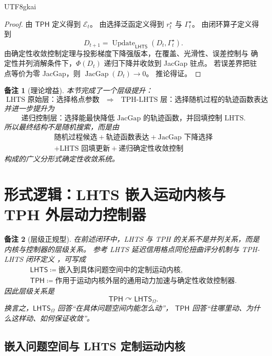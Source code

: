\documentclass[12pt]{article}
\newtheorem{remark}{备注}[section]
\newcommand{\LHTS}{\ensuremath{\mathsf{LHTS}}}
\newcommand{\TPH}{\ensuremath{\mathsf{TPH}}}
\newcommand{\DefEq}{\coloneqq}
\DeclareMathOperator{\JacGap}{JacGap}
\DeclareMathOperator{\Update}{Update}
\begin{document}
\begin{CJK*}{UTF8}{gkai}
\begin{proof}
由 \(\TPH\) 定义得到 \(\mathcal E_t\)。
由选择泛函定义得到 \(r_t^\star\) 与 \(\Gamma_t^\star\)。
由闭环算子定义得到
\[
D_{t+1}
=
\Update_{\LHTS}(D_t,\Gamma_t^\star).
\]
由确定性收敛控制定理与投影梯度下降强版本，在覆盖、光滑性、误差控制与
确定性并列消解条件下，\(\Phi(D_t)\) 递归下降并收敛到 JacGap 驻点。
若误差界把驻点等价为零 JacGap，则 \(\JacGap(D_t)\to0\)。
推论得证。
\end{proof}

\begin{remark}[理论增益]
本节完成了一个层级提升：
\[
\boxed{
\text{LHTS 原始层：选择格点参数}
\quad\Longrightarrow\quad
\text{TPH-LHTS 层：选择随机过程的轨迹函数表达}
}
\]
并进一步提升为
\[
\boxed{
\text{递归控制层：选择能最快降低 JacGap 的轨迹函数，并回填控制 LHTS}.
}
\]
所以最终结构不是随机搜索，而是由
\[
\boxed{
\begin{gathered}
\text{随机过程候选}
+\text{轨迹函数表达}
+\text{JacGap 下降选择}
\\
+\text{LHTS 回填更新}
+\text{递归确定性收敛控制}
\end{gathered}
}
\]
构成的广义分形式确定性收敛系统。
\end{remark}

\section{形式逻辑：LHTS 嵌入运动内核与 TPH 外层动力控制器}
\label{sec:lhts-kernel-tph-controller}

\begin{remark}[层级正规型]
在前述闭环中，LHTS 与 TPH 的关系不是并列关系，而是内核与控制器的层级关系。
参考 LHTS 延迟信用格点同伦扭曲评分机制与 TPH-LHTS 闭环定义
\cite{RepoTex56LHTS,RepoTex55PDEParadigm}，可写成
\[
\boxed{
\begin{gathered}
\LHTS
\DefEq
\text{嵌入到具体问题空间中的定制运动内核},
\\
\TPH
\DefEq
\text{作用于运动内核外层的通用动力加速与确定性收敛控制器}.
\end{gathered}
}
\]
因此层级关系是
\[
\boxed{
\TPH\curvearrowright\LHTS_{\Omega}.
}
\]
换言之，\(\LHTS_\Omega\) 回答“在具体问题空间内能怎么动”，
\(\TPH\) 回答“往哪里动、为什么这样动、如何保证收敛”。
\end{remark}

\subsection{嵌入问题空间与 LHTS 定制运动内核}
\label{subsec:embedded-problem-lhts-kernel}


\end{CJK*}
\end{document}
